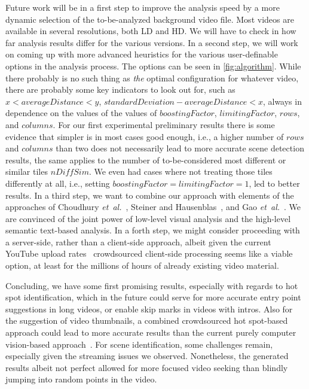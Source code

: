 \documentclass[10pt,twocolumn,letterpaper]{article}
\begin{document}
Future work will be in a first step to improve the analysis speed by a more dynamic selection of the to-be-analyzed background video file. Most videos are available in several resolutions, both LD and HD. We will have to check in how far analysis results differ for the various versions. In a second step, we will work on coming up with more advanced heuristics for the various user-definable options in the analysis process. The options can be seen in \autoref{fig:algorithm}. While there probably is no such thing as \emph{the} optimal configuration for whatever video, there are probably some key indicators to look out for, such as $x < averageDistance  < y$, $standardDeviation - averageDistance < x$, always in dependence on the values of the values of $boostingFactor$, $limitingFactor$, $rows$, and $columns$. For our first experimental preliminary results there is some evidence that simpler is in most cases good enough, i.e., a higher number of $rows$ and $columns$ than two does not necessarily lead to more accurate scene detection results, the same applies to the number of to-be-considered most different or similar tiles $nDiffSim$. We even had cases where not treating those tiles differently at all, i.e., setting $boostingFactor  = limitingFactor = 1$, led to better results. In a third step, we want to combine our approach with elements of the approaches of Choudhury \emph{et~al.}~\cite{Choudhury:YouTube}, Steiner and Hausenblas~\cite{semwebvid}, and Gao \emph{et~al.}~\cite{Gao:2009}. We are convinced of the joint power of low-level visual analysis and the high-level semantic text-based analysis. In a forth step, we might consider proceeding with a server-side, rather than a client-side approach, albeit given the current YouTube upload rates~\cite{youtube:stats} crowdsourced client-side processing seems like a viable option, at least for the millions of hours of already existing video material.

Concluding, we have some first promising results, especially with regards to hot spot identification, which in the future could serve for more accurate entry point suggestions in long videos, or enable skip marks in videos with intros. Also for the suggestion of video thumbnails, a combined crowdsourced hot spot-based approach could lead to more accurate results than the current purely computer vision-based approach~\cite{googleresearch}. For scene identification, some challenges remain, especially given the streaming issues we observed. Nonetheless, the generated results albeit not perfect allowed for more focused video seeking than blindly jumping into random points in the video.

{\small


}
\end{document}
